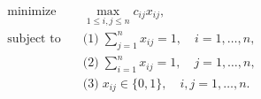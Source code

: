 \begin{align*}
\text{minimize} \quad & \max_{1 \leq i, j \leq n} c_{ij} x_{ij}, \\
\text{subject to} \quad & \text{(1)} \; \sum_{j=1}^n x_{ij} = 1, \quad i = 1, \ldots, n,  \\
& \text{(2)} \; \sum_{i=1}^n x_{ij} = 1, \quad j = 1, \ldots, n,  \\
& \text{(3)} \; x_{ij} \in \lbrace 0, 1 \rbrace, \quad i,j = 1, \ldots,n.
\end{align*}
